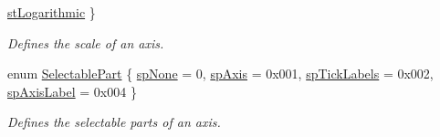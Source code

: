 \begin{DoxyCompactItemize}
\hyperlink{classQCPAxis_a36d8e8658dbaa179bf2aeb973db2d6f0abf5b785ad976618816dc6f79b73216d4}{st\+Logarithmic}
 \}\begin{DoxyCompactList}\small\item\em Defines the scale of an axis. \end{DoxyCompactList}
\item 
enum \hyperlink{classQCPAxis_abee4c7a54c468b1385dfce2c898b115f}{Selectable\+Part} \{ \hyperlink{classQCPAxis_abee4c7a54c468b1385dfce2c898b115fae0df8123a5528d5ccf87cb7794f971ea}{sp\+None} = 0, 
\hyperlink{classQCPAxis_abee4c7a54c468b1385dfce2c898b115fa8949d2c1a31eccae9be7ed32e7a1ae38}{sp\+Axis} = 0x001, 
\hyperlink{classQCPAxis_abee4c7a54c468b1385dfce2c898b115fa584e0a3dc4d064880647619f4bd4e771}{sp\+Tick\+Labels} = 0x002, 
\hyperlink{classQCPAxis_abee4c7a54c468b1385dfce2c898b115fa851e0600e0d08b4f5fee9361e3fedabd}{sp\+Axis\+Label} = 0x004
 \}\begin{DoxyCompactList}\small\item\em Defines the selectable parts of an axis. \end{DoxyCompactList}
\end{DoxyCompactItemize}
